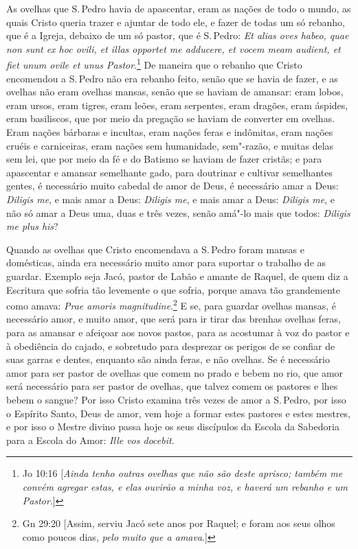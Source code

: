 As ovelhas que S.\,Pedro havia de apascentar, eram as nações de todo o
mundo, as quais Cristo queria trazer e ajuntar de todo ele, e fazer de
todas um só rebanho, que é a Igreja, debaixo de um só pastor, que é S.\,Pedro: \emph{Et alias oves habeo, quae non sunt ex hoc ovili, et illas
opportet me adducere, et vocem meam audient, et fiet unum ovile et unus
Pastor}.\footnote{Jo 10:16 [\emph{Ainda tenho outras ovelhas que não são deste aprisco; também me convém agregar estas, e elas ouvirão a minha voz, e haverá um rebanho e um Pastor}.]} De maneira que o rebanho que Cristo encomendou a S.\,Pedro não
era rebanho feito, senão que se havia de fazer, e as ovelhas não eram
ovelhas mansas, senão que se haviam de amansar: eram lobos, eram ursos,
eram tigres, eram leões, eram serpentes, eram dragões, eram áspides,
eram basiliscos, que por meio da pregação se haviam de converter em
ovelhas. Eram nações bárbaras e incultas, eram nações feras e indômitas,
eram nações cruéis e carniceiras, eram nações sem humanidade, sem"-razão,
e muitas delas sem lei, que por meio da fé e do Batismo se haviam de
fazer cristãs; e para apascentar e amansar semelhante gado, para
doutrinar e cultivar semelhantes gentes, é necessário muito cabedal de
amor de Deus, é necessário amar a Deus: \emph{Diligis me}, e mais amar a
Deus: \emph{Diligis me}, e mais amar a Deus: \emph{Diligis me}, e não só
amar a Deus uma, duas e três vezes, senão amá"-lo mais que todos:
\emph{Diligis me plus his}?

Quando as ovelhas que Cristo encomendava a S.\,Pedro foram mansas e
domésticas, ainda era necessário muito amor para suportar o trabalho de
as guardar. Exemplo seja Jacó, pastor de Labão e amante de Raquel, de
quem diz a Escritura que sofria tão levemente o que sofria, porque amava
tão grandemente como amava: \emph{Prae amoris magnitudine}.\footnote{Gn 29:20 [Assim, serviu Jacó sete anos por Raquel; e foram aos seus olhos como poucos dias, \emph{pelo
muito que a amava}.]}
E se, para guardar ovelhas mansas, é necessário amor, e muito amor,
que será para ir tirar das brenhas ovelhas feras, para as amansar e
afeiçoar aos novos pastos, para as acostumar à voz do pastor e à
obediência do cajado, e sobretudo para desprezar os perigos de se
confiar de suas garras e dentes, enquanto são ainda feras, e não
ovelhas.
Se é necessário amor para ser pastor de ovelhas que comem no prado e
bebem no rio, que amor será necessário para ser pastor de ovelhas, que
talvez comem os pastores e lhes bebem o sangue? Por isso Cristo examina
três vezes de amor a S.\,Pedro, por isso o Espírito Santo, Deus de amor,
vem hoje a formar estes pastores e estes mestres, e por isso o Mestre
divino passa hoje os seus discípulos da Escola da Sabedoria para a
Escola do Amor: \emph{Ille vos docebit}.

